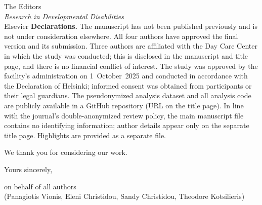 \documentclass[12pt,a4paper]{letter}
\begin{document}
\begin{letter}{The Editors\\
\textit{Research in Developmental Disabilities}\\
Elsevier}
\textbf{Declarations.}
The manuscript has not been published previously and is not under
consideration elsewhere. All four authors have approved the final version and
its submission. Three authors are affiliated with the Day Care Center in which
the study was conducted; this is disclosed in the manuscript and title page,
and there is no financial conflict of interest. The study was approved by the
facility's administration on 1~October~2025 and conducted in accordance with
the Declaration of Helsinki; informed consent was obtained from participants or
their legal guardians. The pseudonymized analysis dataset and all analysis code
are publicly available in a GitHub repository (URL on the title page). In line
with the journal's double-anonymized review policy, the main manuscript file
contains no identifying information; author details appear only on the
separate title page. Highlights are provided as a separate file.

We thank you for considering our work.

\closing{Yours sincerely,}

\vspace{-0.5cm}
\noindent on behalf of all authors\\
(Panagiotis Vionis, Eleni Christidou, Sandy Christidou, Theodore Kotsilieris)

\end{letter}
\end{document}

